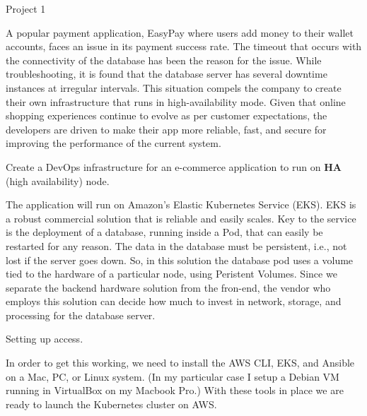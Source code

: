 %





%


\twelvepoint


\ms

Project 1



\bs


\ms

A popular payment application, EasyPay where users add
money to their wallet accounts, faces an issue in its
payment success rate. The timeout that occurs with the
connectivity of the database has been the reason for the issue.
While troubleshooting, it is found that the database server
has several downtime instances at irregular intervals. This
situation compels the company to create their own infrastructure
that runs in high-availability mode.  Given that online shopping
experiences continue to evolve as per customer expectations,
the developers are driven to make their app more reliable, fast,
and secure for improving the performance of the current system.


\bs


\ms

Create a DevOps infrastructure for an e-commerce application to run on {\bf HA\/} (high availability) node.



The application will run on Amazon's Elastic Kubernetes Service (EKS). EKS is a robust commercial
solution that is reliable and easily scales.  Key to the service is the deployment of
a database, running inside a Pod, that can easily be restarted for any reason.
The data in the database must be persistent, i.e., not lost if the server goes down. So, in this solution the database pod uses
a volume tied to the hardware of a particular node, using Peristent Volumes.
Since we separate the backend hardware solution from the fron-end, the vendor who employs this solution can
decide how much to invest in network, storage, and processing for the database server.


\myitem Setting up access.

In order to get this working, we need to install the AWS CLI, EKS, and Ansible on a Mac, PC, or Linux system.
(In my particular case I setup a Debian VM running in VirtualBox on my Macbook Pro.) With these tools in
place we are ready to launch the Kubernetes cluster on AWS.


